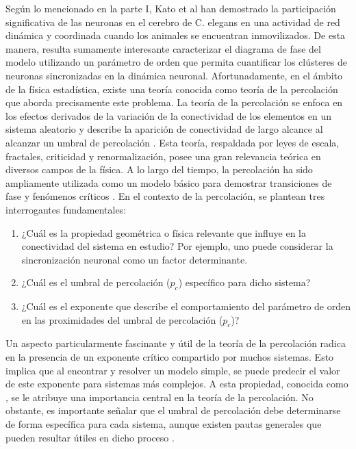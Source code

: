 Según lo  mencionado en la parte I, Kato et al \cite{kato_global_2015}  han demostrado la  participación significativa de las neuronas en el cerebro de C. elegans en una actividad de red dinámica y coordinada cuando los animales se encuentran inmovilizados. De esta manera, resulta sumamente interesante caracterizar el diagrama de fase del modelo utilizando un parámetro de orden que permita cuantificar los clústeres de neuronas sincronizadas en la dinámica neuronal. Afortunadamente, en el ámbito de la física estadística, existe una teoría  conocida como teoría de la percolación que aborda precisamente este problema. La teoría de la percolación se enfoca en los efectos derivados de la variación de la conectividad de los elementos en un sistema aleatorio y describe la aparición de conectividad de largo alcance al alcanzar un umbral de percolación \cite{torquato_percolation_2002}. Esta teoría, respaldada por leyes de escala, fractales, criticidad y renormalización, posee una gran relevancia teórica en diversos campos de la física. A lo largo del tiempo, la percolación ha sido ampliamente utilizada como un modelo básico para demostrar transiciones de fase y fenómenos críticos \cite{li_percolation_2021}. En el contexto de la percolación, se plantean tres interrogantes fundamentales:

\begin{enumerate}[label={(\alph*)}]
\item  ¿Cuál es la propiedad geométrica o física relevante que influye en la conectividad del sistema en estudio? Por ejemplo, uno puede considerar la sincronización neuronal como un factor determinante.
\item ¿Cuál es el umbral de percolación ($p_c$) específico para dicho sistema?
\item  ¿Cuál es el exponente que describe el comportamiento del parámetro de orden en las proximidades del umbral de percolación ($p_c$)?
\end{enumerate}

Un aspecto particularmente fascinante y útil de la teoría de la percolación radica en la presencia de un exponente crítico compartido por muchos sistemas. Esto implica que al encontrar y resolver un modelo simple, se puede predecir el valor de este exponente para sistemas más complejos. A esta propiedad, conocida como , se le atribuye una importancia central en la teoría de la percolación. No obstante, es importante señalar que el umbral de percolación debe determinarse de forma específica para cada sistema, aunque existen pautas generales que pueden resultar útiles en dicho proceso \cite{berkowitz_percolation_1998}.

